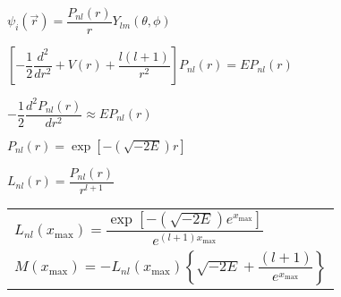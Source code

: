 \documentclass{jarticle}%
\begin{document}
$\psi_{i}\left(  \vec{r}\right)  =\dfrac{P_{nl}\left(  r\right)  }{r}%
Y_{lm}\left(  \theta,\phi\right)  $

$\left[  -\dfrac{1}{2}\dfrac{d^{2}}{dr^{2}}+V\left(  r\right)  +\dfrac
{l\left(  l+1\right)  }{r^{2}}\right]  P_{nl}\left(  r\right)  =EP_{nl}\left(
r\right)  $

$-\dfrac{1}{2}\dfrac{d^{2}P_{nl}\left(  r\right)  }{dr^{2}}\approx
EP_{nl}\left(  r\right)  $

$P_{nl}\left(  r\right)  =\exp\left[  -\left(  \sqrt{-2E}\right)  r\right]  $

$L_{nl}\left(  r\right)  =\dfrac{P_{nl}\left(  r\right)  }{r^{l+1}}$%

\begin{tabular}
[c]{l}%
$L_{nl}\left(  x_{\max}\right)  =\dfrac{\exp\left[  -\left(  \sqrt
{-2E}\right)  e^{x_{\max}}\right]  }{e^{\left(  l+1\right)  x_{\max}}}$\\
$M\left(  x_{\max}\right)  =-L_{nl}\left(  x_{\max}\right)  \left\{
\sqrt{-2E}+\dfrac{\left(  l+1\right)  }{e^{x_{\max}}}\right\}  $%
\end{tabular}
\end{document}
